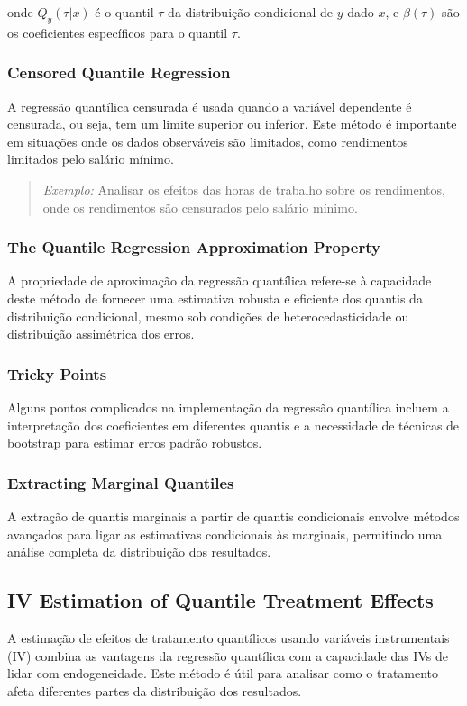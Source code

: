 \documentclass[a4paper,12pt]{article}[abntex2]
\begin{document}
onde \( Q_y(\tau | x) \) é o quantil \( \tau \) da distribuição condicional de \( y \) dado \( x \), e \( \beta(\tau) \) são os coeficientes específicos para o quantil \( \tau \).

\subsubsection{Censored Quantile Regression}
A regressão quantílica censurada é usada quando a variável dependente é censurada, ou seja, tem um limite superior ou inferior. Este método é importante em situações onde os dados observáveis são limitados, como rendimentos limitados pelo salário mínimo.

\begin{quote}
\textit{Exemplo:} Analisar os efeitos das horas de trabalho sobre os rendimentos, onde os rendimentos são censurados pelo salário mínimo.
\end{quote}

\subsubsection{The Quantile Regression Approximation Property}
A propriedade de aproximação da regressão quantílica refere-se à capacidade deste método de fornecer uma estimativa robusta e eficiente dos quantis da distribuição condicional, mesmo sob condições de heterocedasticidade ou distribuição assimétrica dos erros.

\subsubsection{Tricky Points}
Alguns pontos complicados na implementação da regressão quantílica incluem a interpretação dos coeficientes em diferentes quantis e a necessidade de técnicas de bootstrap para estimar erros padrão robustos.

\subsubsection{Extracting Marginal Quantiles}
A extração de quantis marginais a partir de quantis condicionais envolve métodos avançados para ligar as estimativas condicionais às marginais, permitindo uma análise completa da distribuição dos resultados.

\subsection{IV Estimation of Quantile Treatment Effects}
A estimação de efeitos de tratamento quantílicos usando variáveis instrumentais (IV) combina as vantagens da regressão quantílica com a capacidade das IVs de lidar com endogeneidade. Este método é útil para analisar como o tratamento afeta diferentes partes da distribuição dos resultados.
\end{document}
